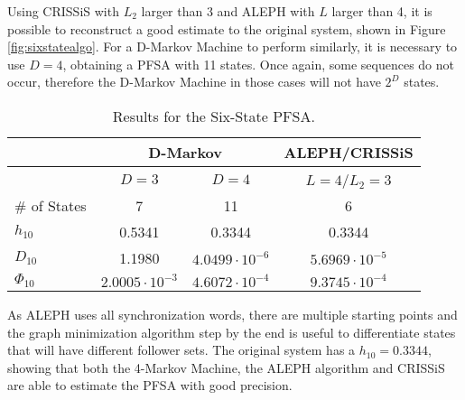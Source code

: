 {Using CRISSiS with $L_2$ larger than 3 and ALEPH with $L$ larger than 4, it is possible to reconstruct a good estimate to the original system, shown in Figure \ref{fig:sixstatealgo}. For a D-Markov Machine to perform similarly, it is necessary to use $D=4$, obtaining a PFSA with 11 states. Once again, some sequences do not occur, therefore the D-Markov Machine in those cases will not have $2^D$ states.

\begin{table}
\centering
\caption{Results for the Six-State PFSA. \label{tab:sixstate}}
\begin{tabular}{|l|c|c|c|}
\hline
 & \multicolumn{2}{c|}{D-Markov} & ALEPH/CRISSiS \\
 \hline
 & $D=3$ & $D=4$ & $L=4$/$L_2=3$ \\
\hline
\# of States & 7 & 11 & 6 \\ 
$h_{10}$ & 0.5341 & 0.3344 & 0.3344 \\
$D_{10}$ & 1.1980 & $4.0499\cdot 10^{-6}$ &  $5.6969\cdot10^{-5}$ \\
$\Phi_{10}$ & $2.0005\cdot 10^{-3}$ & $4.6072\cdot 10^{-4}$ & $9.3745\cdot10^{-4}$ \\
 \hline
\end{tabular}
\end{table}


As ALEPH uses all synchronization words, there are multiple starting points and the graph minimization algorithm step by the end is useful to differentiate states that will have different follower sets. The original system has a $h_{10} = 0.3344$, showing that both the 4-Markov Machine, the ALEPH algorithm and CRISSiS are able to estimate the PFSA with good precision.


}
